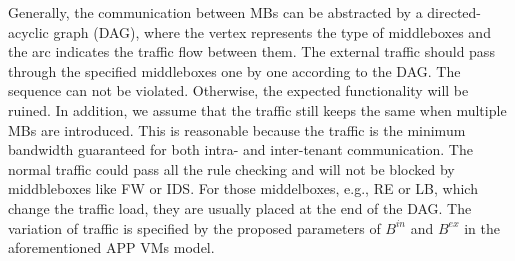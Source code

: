 \documentclass[review]{elsarticle}
\begin{document}
Generally, the communication between MBs can be abstracted by a directed-acyclic graph (DAG), where the vertex represents the type of middleboxes and the arc indicates the traffic flow between them. The external traffic should pass through the specified middleboxes one by one according to the DAG. The sequence can not be violated. Otherwise, the expected functionality will be ruined. In addition, we assume that the traffic still keeps the same when multiple MBs are introduced. This is reasonable because the traffic is the minimum bandwidth guaranteed for both intra- and inter-tenant communication. The normal traffic could pass all the rule checking and will not be blocked by middbleboxes like FW or IDS. For those middelboxes, e.g., RE or LB, which change the traffic load, they are usually placed at the end of the DAG. The variation of traffic is specified by the proposed parameters of $B^{in}$ and $B^{ex}$ in the aforementioned APP VMs model.


\end{document}
